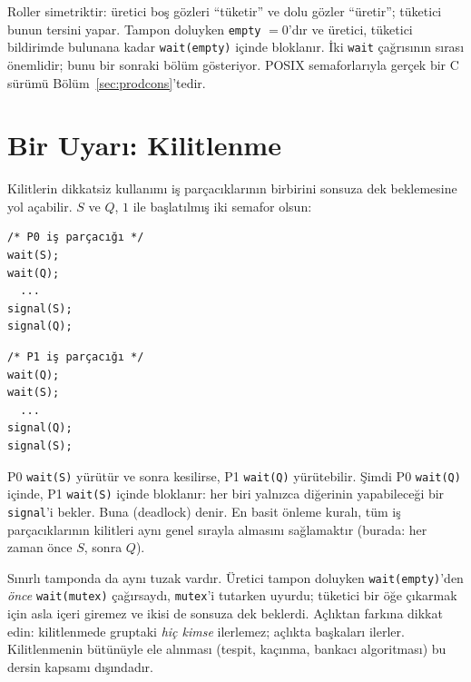 Roller simetriktir: üretici boş gözleri ``tüketir'' ve dolu gözler ``üretir''; tüketici bunun tersini yapar. Tampon doluyken \texttt{empty} $=0$'dır ve üretici, tüketici bildirimde bulunana kadar \texttt{wait(empty)} içinde bloklanır. İki \texttt{wait} çağrısının sırası önemlidir; bunu bir sonraki bölüm gösteriyor. POSIX semaforlarıyla gerçek bir C sürümü Bölüm~\ref{sec:prodcons}'tedir.

\section{Bir Uyarı: Kilitlenme}

Kilitlerin dikkatsiz kullanımı iş parçacıklarının birbirini sonsuza dek beklemesine yol açabilir. $S$ ve $Q$, $1$ ile başlatılmış iki semafor olsun:

\begin{center}
\begin{minipage}[t]{0.3\linewidth}
\begin{lstlisting}[numbers=none]
/* P0 iş parçacığı */
wait(S);
wait(Q);
  ...
signal(S);
signal(Q);
\end{lstlisting}
\end{minipage}\qquad
\begin{minipage}[t]{0.3\linewidth}
\begin{lstlisting}[numbers=none]
/* P1 iş parçacığı */
wait(Q);
wait(S);
  ...
signal(Q);
signal(S);
\end{lstlisting}
\end{minipage}
\end{center}

P0 \texttt{wait(S)} yürütür ve sonra kesilirse, P1 \texttt{wait(Q)} yürütebilir. Şimdi P0 \texttt{wait(Q)} içinde, P1 \texttt{wait(S)} içinde bloklanır: her biri yalnızca diğerinin yapabileceği bir \texttt{signal}'i bekler. Buna  (deadlock) denir. En basit önleme kuralı, tüm iş parçacıklarının kilitleri aynı genel sırayla almasını sağlamaktır (burada: her zaman önce $S$, sonra $Q$).

Sınırlı tamponda da aynı tuzak vardır. Üretici tampon doluyken \texttt{wait(empty)}'den \emph{önce} \texttt{wait(mutex)} çağırsaydı, \texttt{mutex}'i tutarken uyurdu; tüketici bir öğe çıkarmak için asla içeri giremez ve ikisi de sonsuza dek beklerdi. Açlıktan farkına dikkat edin: kilitlenmede gruptaki \emph{hiç kimse} ilerlemez; açlıkta başkaları ilerler. Kilitlenmenin bütünüyle ele alınması (tespit, kaçınma, bankacı algoritması) bu dersin kapsamı dışındadır.

